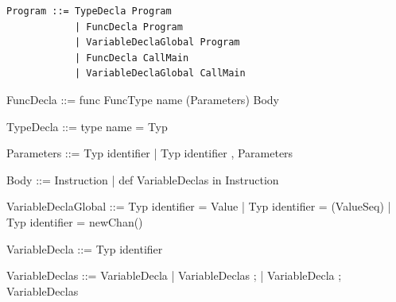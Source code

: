 \documentclass[11pt]{report}
\begin{document}
\newpage
{}
{} 
\vspace*{20 pt}
\vspace*{3pt}
\begin{Verbatim}[fontfamily=textsf]
Program ::= TypeDecla Program
            | FuncDecla Program
            | VariableDeclaGlobal Program
            | FuncDecla CallMain
            | VariableDeclaGlobal CallMain
\end{Verbatim}
\vspace*{3pt}

\begin{verbnobox}[\normalfont]
FuncDecla ::= func FuncType name (Parameters) Body
\end{verbnobox}
\vspace*{3pt}

\begin{verbnobox}[\normalfont]
TypeDecla ::= type name = Typ
\end{verbnobox}
\vspace*{3pt}

\begin{verbnobox}[\normalfont]
Parameters ::= Typ identifier | Typ identifier , Parameters
\end{verbnobox}
\vspace*{3pt}

\begin{verbnobox}[\normalfont]
Body ::= { Instruction } | { def VariableDeclas in Instruction }
\end{verbnobox}
\vspace*{3pt}

\begin{verbnobox}[\normalfont]
VariableDeclaGlobal ::= Typ identifier = Value 
                            | Typ identifier = (ValueSeq)
                            | Typ identifier = newChan()
\end{verbnobox}
\vspace*{3pt}

\begin{verbnobox}[\normalfont]
VariableDecla ::= Typ identifier
\end{verbnobox}
\vspace*{3pt}

\begin{verbnobox}[\normalfont]
VariableDeclas ::= VariableDecla 
                    | VariableDeclas ; 
                    | VariableDecla ; VariableDeclas
\end{verbnobox}
\vspace*{3pt}
\end{document}
